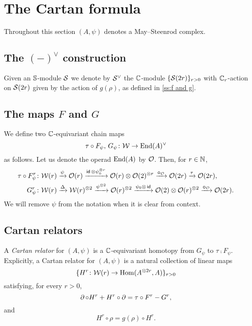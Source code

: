 
\section{The Cartan formula}\label{s:cartan}

Throughout this section $(A,\psi)$ denotes a May--Steenrod complex.

\subsection{The $(-)^\vee$ construction}

Given an $\mathbb{S}$-module $\mathcal{S}$ we denote by $\mathcal{S}^\vee$ the $\mathbb{C}$-module $\{\mathcal{S}(2r)\}_{r>0}$ with $\mathbb{C}_r$-action on $\mathcal{S}(2r)$ given by the action of $g(\rho)$, as defined in \cref{ss:f and g}.

\subsection{The maps $F$ and $G$}

We define two $\mathbb{C}$-equivariant chain maps
\[
\tau \mathbin{\circ} F_\psi,\, G_\psi \colon \mathcal{W} \to \mathrm{End}(A)^\vee
\]
as follows.
Let us denote the operad $\mathrm{End}(A)$ by $\mathcal{O}$.
Then, for $r \in \mathbb{N}$,
\begin{align*}
	\tau \mathbin{\circ} F_\psi^r \colon& \mathcal{W}(r) \xrightarrow{\psi} \mathcal{O}(r) \xrightarrow{\mathsf{id}\, \otimes \psi_0^{\otimes r}}
	\mathcal{O}(r) \otimes \mathcal{O}(2)^{\otimes r} \xrightarrow{\bm{\circ}_{\mathcal{O}}}
	\mathcal{O}(2r) \xrightarrow{\tau} \mathcal{O}(2r), \\
	G_\psi^r \colon& \mathcal{W}(r) \xrightarrow{\Delta}
	\mathcal{W}(r)^{\otimes 2} \xrightarrow{\psi^{\otimes 2}}
	\mathcal{O}(r)^{\otimes 2} \xrightarrow{\psi_0 \otimes\, \mathsf{id}}
	\mathcal{O}(2) \otimes \mathcal{O}(r)^{\otimes 2} \xrightarrow{\bm{\circ}_{\mathcal{O}}}
	\mathcal{O}(2r).
\end{align*}
We will remove $\psi$ from the notation when it is clear from context.

\subsection{Cartan relators}\label{ss:cartan_relators}

A \textit{Cartan relator} for $(A,\psi)$ is a $\mathbb{C}$-equivariant homotopy from $G_\psi$ to $\tau \comp F_\psi$.
Explicitly, a Cartan relator for $(A,\psi)$ is a natural collection of linear maps
\[
\{H^r \colon \mathcal{W}(r) \to \mathrm{Hom}(A^{\otimes 2r}, A)\}_{r>0}
\]
satisfying, for every $r > 0$,
\[
\operatorname{\partial} \circ H^r + H^r \mathbin{\circ} \operatorname{\partial} = \tau \mathbin{\circ} F^r - G^r,
\]
and
\[
H^r \circ \rho = g(\rho) \circ H^r.
\]

